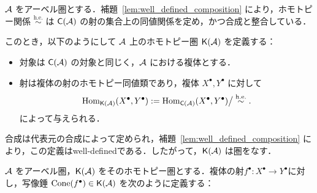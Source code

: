 \begin{defn}\cite[p.273]{KS06}
${\mathcal A}$ をアーベル圏とする．補題~\ref{lem:well_defined_composition} により，ホモトピー関係 $\overset{\mathrm{h.e.}}{\sim}$ は $\mathsf{C}({\mathcal A})$ の射の集合上の同値関係を定め，かつ合成と整合している．

このとき，以下のようにして ${\mathcal A}$ 上のホモトピー圏 $\mathsf{K}({\mathcal A})$ を定義する：

\begin{itemize}
  \item 対象は $\mathsf{C}({\mathcal A})$ の対象と同じく，${\mathcal A}$ における複体とする．
  \item 射は複体の射のホモトピー同値類であり，複体 $X^\bullet, Y^\bullet$ に対して
  \[
    \operatorname{Hom}_{\mathsf{K}({\mathcal A})}(X^\bullet, Y^\bullet) := \operatorname{Hom}_{\mathsf{C}({\mathcal A})}(X^\bullet, Y^\bullet) \big/ \overset{\mathrm{h.e.}}{\sim}.
  \]
  によって与えられる．
\end{itemize}

合成は代表元の合成によって定められ，補題~\ref{lem:well_defined_composition} により，この定義はwell-definedである．したがって，$\mathsf{K}({\mathcal A})$ は圏をなす．
\end{defn}

${\mathcal A}$ をアーベル圏，$\mathsf{K}({\mathcal A})$ をそのホモトピー圏とする．複体の射$f^\bullet: X^\bullet \to Y^\bullet$に対し，写像錘 $\operatorname{\mathrm{Cone}}(f^\bullet) \in \mathsf{K}({\mathcal A})$ を次のように定義する：

